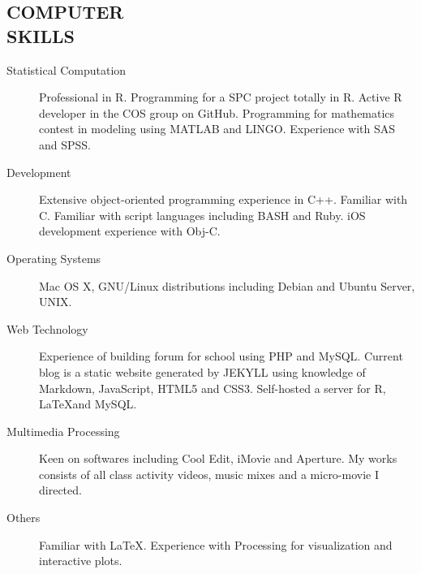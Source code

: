 \documentclass[margin]{res}
\begin{document}
\begin{resume}
 
\section{COMPUTER \\ SKILLS}

\begin{description}
\item[Statistical Computation] Professional in R. Programming for a SPC project totally in R. Active R developer in the COS group on GitHub. Programming for mathematics contest in modeling using MATLAB and LINGO. Experience with SAS and SPSS. 
\item[Development] Extensive object-oriented programming experience in C++. Familiar with C. Familiar with script languages including BASH and Ruby. iOS development experience with Obj-C.
\item[Operating Systems] Mac OS X, GNU/Linux distributions including Debian and Ubuntu Server, UNIX.
\item[Web Technology] Experience of building forum for school using PHP and MySQL. Current blog is a static website generated by JEKYLL using knowledge of Markdown, JavaScript, HTML5 and CSS3. Self-hosted a server for R, \LaTeX and MySQL.
\item[Multimedia Processing] Keen on  softwares including Cool Edit, iMovie and Aperture. My works consists of all class activity videos, music mixes and a micro-movie I directed.
\item[Others]Familiar with \LaTeX. Experience with Processing for visualization and interactive plots.
\end{description}


\end{resume}
\end{document}
